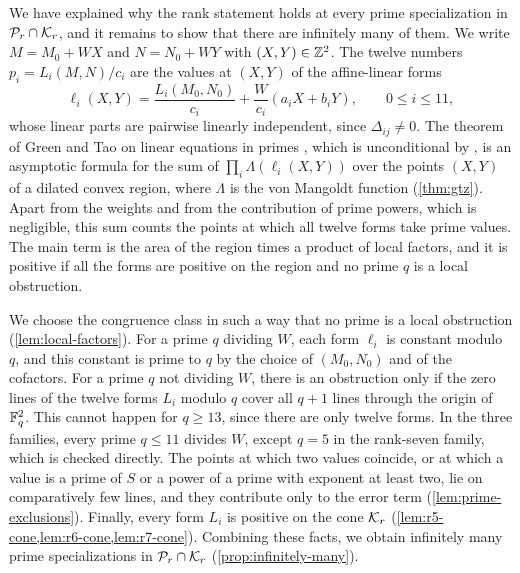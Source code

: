 We have explained why the rank statement holds at every prime specialization in $\mathcal P_r\cap\mathcal K_r$, and it remains to show that there are infinitely many of them. We write $M=M_0+WX$ and $N=N_0+WY$ with $(X,Y)\in\mathbb Z^2$. The twelve numbers $p_i=L_i(M,N)/c_i$ are the values at $(X,Y)$ of the affine-linear forms
\begin{equation*}
\ell_i(X,Y)=\frac{L_i(M_0,N_0)}{c_i}+\frac W{c_i}(a_iX+b_iY),\qquad0\le i\le11,
\end{equation*}
whose linear parts are pairwise linearly independent, since $\Delta_{ij}\ne0$. The theorem of Green and Tao on linear equations in primes \cite{GT2010}, which is unconditional by \cite{GT2012,GTZ2012}, is an asymptotic formula for the sum of $\prod_i\Lambda(\ell_i(X,Y))$ over the points $(X,Y)$ of a dilated convex region, where $\Lambda$ is the von Mangoldt function (\cref{thm:gtz}). Apart from the weights and from the contribution of prime powers, which is negligible, this sum counts the points at which all twelve forms take prime values. The main term is the area of the region times a product of local factors, and it is positive if all the forms are positive on the region and no prime $q$ is a local obstruction.

We choose the congruence class in such a way that no prime is a local obstruction (\cref{lem:local-factors}). For a prime $q$ dividing $W$, each form $\ell_i$ is constant modulo $q$, and this constant is prime to $q$ by the choice of $(M_0,N_0)$ and of the cofactors. For a prime $q$ not dividing $W$, there is an obstruction only if the zero lines of the twelve forms $L_i$ modulo $q$ cover all $q+1$ lines through the origin of $\mathbb F_q^2$. This cannot happen for $q\ge13$, since there are only twelve forms. In the three families, every prime $q\le11$ divides $W$, except $q=5$ in the rank-seven family, which is checked directly. The points at which two values coincide, or at which a value is a prime of $S$ or a power of a prime with exponent at least two, lie on comparatively few lines, and they contribute only to the error term (\cref{lem:prime-exclusions}). Finally, every form $L_i$ is positive on the cone $\mathcal K_r$ (\cref{lem:r5-cone,lem:r6-cone,lem:r7-cone}). Combining these facts, we obtain infinitely many prime specializations in $\mathcal P_r\cap\mathcal K_r$ (\cref{prop:infinitely-many}). 

